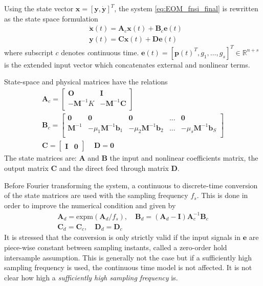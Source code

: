 Using the state vector $\bm x = [\bm y, \dot{\bm y}]^T$, the system
\eqref{eq:EOM_fnsi_final} is rewritten as the state space formulation
\begin{equation}
  \label{eq:fnsi_c_state_space}
  \begin{split}
    &\dot{\bm x}(t) = \bm A_c \bm x(t) + \bm B_c \bm e(t) \\
    &\bm y(t) = \bm C \bm x(t) + \bm D \bm e(t)
  \end{split}
\end{equation}
where subscript $c$ denotes {\textit continuous time}. $\bm e(t) =
[\bm p(t)^T, g_1, \dots , g_s]^T \in \mathbb{R}^{n+s}$ is the extended input
vector which concatenates external and nonlinear terms.

State-space and physical matrices have the relations
\begin{equation}
  \label{eq:state_to_physical_mat}
  \begin{gathered}
  \bm A_c =
  \begin{bmatrix}
    \bm O  & \bm I \\
    -\bm M^{-1}K     & -\bm M^{-1} \bm C \\
  \end{bmatrix}
  \\
  \bm B_c =
  \begin{bmatrix}
    \bm 0 & \bm 0 & \bm 0 & ... & \bm 0 \\
    \bm M^{-1}  & -\mu_1 \bm M^{-1} \bm b_1 & -\mu_2 \bm M^{-1} \bm b_2 & ... &
    -\mu_s \bm M^{-1} \bm b_S \\
  \end{bmatrix}
  \\
  \bm C =
  \begin{bmatrix}
    \bm I & \bm 0
  \end{bmatrix}
  \,\quad
  \bm D = \bm 0
\end{gathered}
\end{equation}
The state matrices are: $\bm A$ and $\bm B$ the input and nonlinear coefficients
matrix, the output matrix $\bm C$ and the direct feed through matrix $\bm D$.

Before Fourier transforming the system, a continuous to discrete-time conversion
of the state matrices are used with the sampling frequency $f_s$. This is done
in order to improve the numerical condition and given by
\begin{equation}
  \begin{gathered}
    \bm A_d = \text{expm}(\bm A_d/f_s) ,\quad
    \bm B_d = (\bm A_d - \bm I)\bm A_c^{-1} \bm B_c \\
    \bm C_d = \bm C_c ,\quad \bm D_d = \bm D_c
  \end{gathered}
\end{equation}
It is stressed\autocite{noel2013a} that the conversion is only strictly valid if
the input signals in $\bm e$ are piece-wise constant between sampling instants,
called a zero-order hold intersample assumption. This is generally not the case
but if a sufficiently high sampling frequency is used, the continuous time model
is not affected. It is not clear how high a \textit{sufficiently high sampling
  frequency} is.

